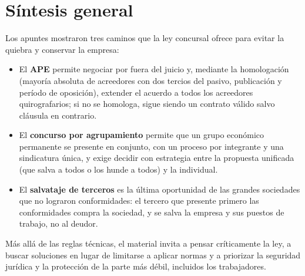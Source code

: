 \documentclass[12pt,oneside]{book}
\begin{document}
\chapter[Síntesis general]{Síntesis general}

Los apuntes mostraron tres caminos que la ley concursal ofrece para evitar la quiebra y conservar la empresa:

\begin{itemize}
    \item El \textbf{APE} permite negociar por fuera del juicio y, mediante la homologación (mayoría absoluta de acreedores con dos tercios del pasivo, publicación y período de oposición), extender el acuerdo a todos los acreedores quirografarios; si no se homologa, sigue siendo un contrato válido salvo cláusula en contrario.
    \item El \textbf{concurso por agrupamiento} permite que un grupo económico permanente se presente en conjunto, con un proceso por integrante y una sindicatura única, y exige decidir con estrategia entre la propuesta unificada (que salva a todos o los hunde a todos) y la individual.
    \item El \textbf{salvataje de terceros} es la última oportunidad de las grandes sociedades que no lograron conformidades: el tercero que presente primero las conformidades compra la sociedad, y se salva la empresa y sus puestos de trabajo, no al deudor.
\end{itemize}

Más allá de las reglas técnicas, el material invita a pensar críticamente la ley, a buscar soluciones en lugar de limitarse a aplicar normas y a priorizar la seguridad jurídica y la protección de la parte más débil, incluidos los trabajadores.
\end{document}
